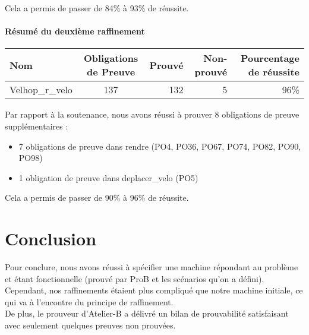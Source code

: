 \documentclass[12pt]{article}
\begin{document}
Cela a permis de passer de 84\% à 93\% de réussite.

\paragraph{Résumé du deuxième raffinement}
\begin{center}
	\begin{tabular}{| l | c | r | r|r|}
		\hline
		Nom & Obligations de Preuve & Prouvé & Non-prouvé & Pourcentage de réussite\\ \hline
    Velhop\_r\_velo & 137 & 132 & 5 & 96\% \\ \hline
	\end{tabular}
\end{center}

Par rapport à la soutenance, nous avons réussi à prouver 8 obligations de preuve supplémentaires : 
\begin{itemize}
  \item 7 obligations de preuve dans rendre (PO4, PO36, PO67, PO74, PO82, PO90, PO98)
  \item 1 obligation de preuve dans deplacer\_velo (PO5)
\end{itemize}

Cela a permis de passer de 90\% à 96\% de réussite.

\newpage
\section{Conclusion}
Pour conclure, nous avons réussi à spécifier une machine répondant au problème et étant fonctionnelle (prouvé par ProB et les scénarios qu'on a défini). Cependant, nos raffinements étaient plus compliqué que notre machine initiale, ce qui va à l'encontre du principe de raffinement.\\

De plus, le prouveur d'Atelier-B a délivré un bilan de prouvabilité satisfaisant avec seulement quelques preuves non prouvées.
\end{document}
